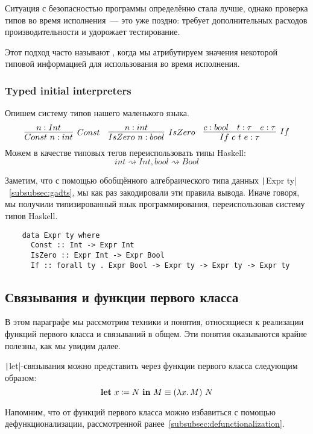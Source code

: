 Ситуация с безопасностью программы определённо стала лучше, однако проверка типов во время исполнения~--- это уже поздно: требует дополнительных расходов производительности и удорожает тестирование.

Этот подход часто называют , когда мы атрибутируем значения некоторой типовой информацией для использования во время исполнения.

\subsubsection{Typed initial interpreters} \label{subsubsec:typed-initial}

Опишем систему типов нашего маленького языка.
\begin{equation*}{}
    \infer[Const]{Const~n : int}{n : Int}
    \quad
    \infer[IsZero]{IsZero~n : bool}{n : int}
    \quad
    \infer[If]{If~c~t~e : \tau}{c : bool & t : \tau & e : \tau}
\end{equation*}
Можем в качестве типовых тегов переиспользовать типы Haskell: \[int \rightsquigarrow Int, bool \rightsquigarrow Bool\]

Заметим, что с помощью обобщённого алгебраического типа данных \texttt|Expr ty|~\ref{subsubsec:gadts}, мы как раз закодировали эти правила вывода.
Иначе говоря, мы получили типизированный язык программирования, переиспользовав систему типов Haskell.
\begin{verbatim}
    data Expr ty where
      Const :: Int -> Expr Int
      IsZero :: Expr Int -> Expr Bool
      If :: forall ty . Expr Bool -> Expr ty -> Expr ty -> Expr ty
\end{verbatim}

\subsection{Связывания и функции первого класса} \label{subsec:first-class-functions}

В этом параграфе мы рассмотрим техники и понятия, относящиеся к реализации функций первого класса и связываний в общем.
Эти понятия оказываются крайне полезны, как мы увидим далее.

\texttt|let|-связывания можно представить через функции первого класса следующим образом:
\[
    \mathbf{let} ~ x \coloneqq N ~ \mathbf{in} ~ M \equiv (\lambda x\ldotp M) ~ N
\]

Напомним, что от функций первого класса можно избавиться с помощью дефункционализации, рассмотренной ранее~\ref{subsubsec:defunctionalization}.

